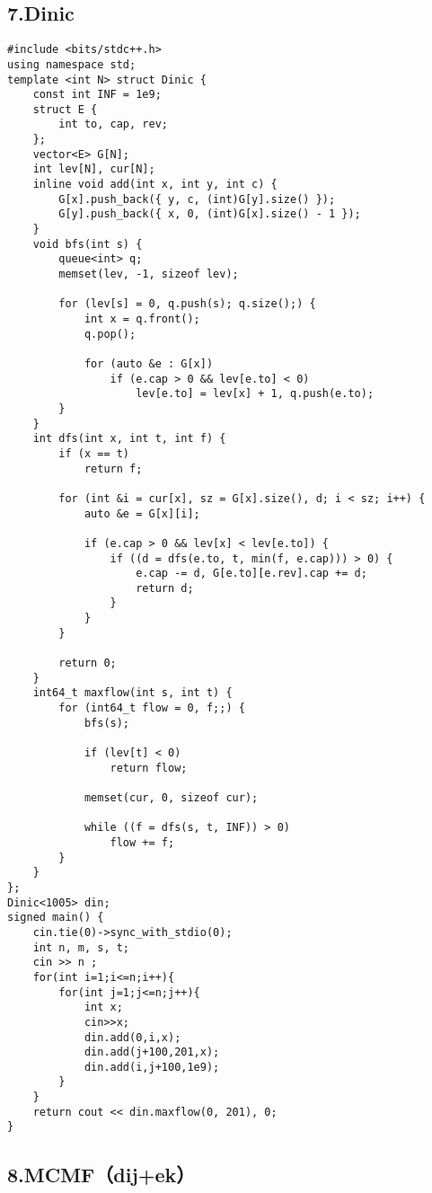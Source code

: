 \documentclass[]{article}
\begin{document}
\hypertarget{dinic}{%
\subsection{7.Dinic}\label{dinic}}

\begin{verbatim}
#include <bits/stdc++.h>
using namespace std;
template <int N> struct Dinic {
    const int INF = 1e9;
    struct E {
        int to, cap, rev;
    };
    vector<E> G[N];
    int lev[N], cur[N];
    inline void add(int x, int y, int c) {
        G[x].push_back({ y, c, (int)G[y].size() });
        G[y].push_back({ x, 0, (int)G[x].size() - 1 });
    }
    void bfs(int s) {
        queue<int> q;
        memset(lev, -1, sizeof lev);

        for (lev[s] = 0, q.push(s); q.size();) {
            int x = q.front();
            q.pop();

            for (auto &e : G[x])
                if (e.cap > 0 && lev[e.to] < 0)
                    lev[e.to] = lev[x] + 1, q.push(e.to);
        }
    }
    int dfs(int x, int t, int f) {
        if (x == t)
            return f;

        for (int &i = cur[x], sz = G[x].size(), d; i < sz; i++) {
            auto &e = G[x][i];

            if (e.cap > 0 && lev[x] < lev[e.to]) {
                if ((d = dfs(e.to, t, min(f, e.cap))) > 0) {
                    e.cap -= d, G[e.to][e.rev].cap += d;
                    return d;
                }
            }
        }

        return 0;
    }
    int64_t maxflow(int s, int t) {
        for (int64_t flow = 0, f;;) {
            bfs(s);

            if (lev[t] < 0)
                return flow;

            memset(cur, 0, sizeof cur);

            while ((f = dfs(s, t, INF)) > 0)
                flow += f;
        }
    }
};
Dinic<1005> din;
signed main() {
    cin.tie(0)->sync_with_stdio(0);
    int n, m, s, t;
    cin >> n ;
    for(int i=1;i<=n;i++){
        for(int j=1;j<=n;j++){
            int x;
            cin>>x;
            din.add(0,i,x);
            din.add(j+100,201,x);
            din.add(i,j+100,1e9);
        }
    }
    return cout << din.maxflow(0, 201), 0;
}
\end{verbatim}

\hypertarget{mcmfdijek}{%
\subsection{8.MCMF（dij+ek）}\label{mcmfdijek}}
\end{document}
